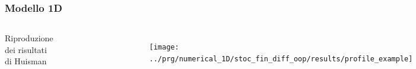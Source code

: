 \begin{frame}
  \frametitle{Modello 1D}
  \begin{columns}

    Riproduzione dei risultati di Huisman
    \begin{figure}[!htb]
      \centering
      \includegraphics[width=\textwidth]{../img/huisman_profile}
    \end{figure}

    \begin{figure}[!htb]
      \centering
      \texttt{[image: ../prg/numerical\_1D/stoc\_fin\_diff\_oop/results/profile\_example]}
    \end{figure}

  \end{columns}
\end{frame}


